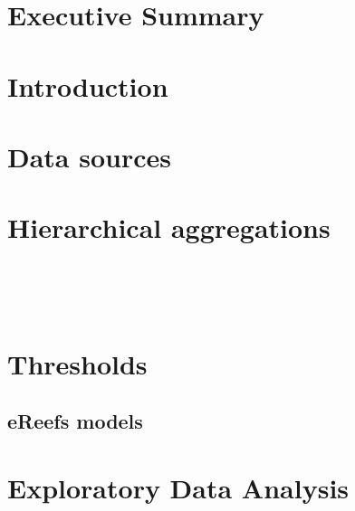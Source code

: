 \documentclass[a4paper]{AIMSreport}
\begin{document}


 
\section{Executive Summary}

\section{Introduction}

\section{Data sources}

%

  

 
 

 

\section{Hierarchical aggregations}

%
  
 
~\\[2em]



~\\[2em]
\setcounter{table}{0}
\setcounter{figure}{0}
\renewcommand{\thetable}{\Alph{section}\arabic{table}}
\renewcommand{\thefigure}{\Alph{section}\arabic{figure}}
 
   
\section{Thresholds} 

\clearpage

% 

\clearpage

\begin{landscape}       
\section{eReefs models}
 
%
\end{landscape}  
 
\clearpage 

\section{Exploratory Data Analysis}

%
\end{document}
